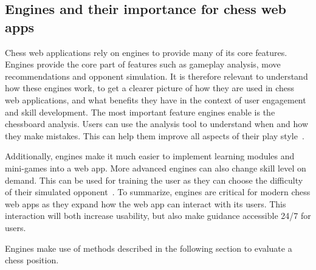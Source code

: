 \subsection{Engines and their importance for chess web apps}\label{subsec:webapps-engines}

Chess web applications rely on engines to provide many of its core features.
Engines provide the core part of features such as gameplay analysis,
move recommendations and opponent simulation.
It is therefore relevant to understand how these engines work,
to get a clearer picture of how they are used in chess web applications,
and what benefits they have in the context of user engagement and skill
development.
The most important feature engines enable is the chessboard analysis.
Users can use the analysis tool to understand when and how they make mistakes.
This can help them improve all aspects of their play style~\cite{chess-com-chess-engines}.

Additionally, engines make it much easier to implement learning modules
and mini-games into a web app.
More advanced engines can also change skill level on demand.
This can be used for training the user as they can choose the difficulty of
their simulated opponent~\cite{chess-com-chess-engines}.
To summarize, engines are critical for modern chess web apps as they
expand how the web app can interact with its users.
This interaction will both increase usability, but also make guidance accessible
24/7 for users.

Engines make use of methods described in the following section to evaluate a chess position.
